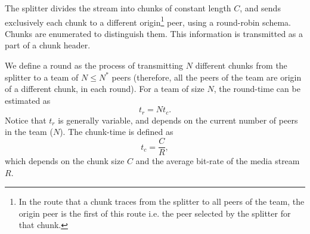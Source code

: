 

\label{sec:feeding_the_team}

The splitter divides the stream into chunks of constant length $C$,
and sends exclusively each chunk to a different
\gls{origin}\footnote{In the route that a chunk traces from the
  splitter to all peers of the team, the origin peer is the first of
  this route i.e. the peer selected by the splitter for that chunk.}
peer, using a round-robin schema. Chunks are enumerated to distinguish
them. This information is transmitted as a part of a chunk header.

\begin{comment}
More details about the implementation
are available in Fig.~\ref{fig:chunk_generation}.


\begin{figure*}
  \fig{500}{5cm}{DBS_splitter_feed} \caption{Chunk
    generation at the splitter and their transmission to the
    team.\label{fig:chunk_generation}}
\end{figure*}
\end{comment}

We define a \gls{round} as the process of transmitting $N$ different
chunks from the splitter to a team of $N\leq N^*$ peers (therefore,
all the peers of the team are origin of a different chunk, in each
round). For a team of size $N$, the \gls{round-time} can be estimated
as
\begin{equation}
  t_r=Nt_c.
\end{equation}
Notice that $t_r$ is generally variable, and depends on
the current number of peers in the team ($N$). The
\gls{chunk-time} is defined as 
\begin{equation}
  \label{eq:chunk_time}
  t_c=\frac{C}{R},
\end{equation}
which depends on the chunk size $C$ and the average bit-rate of the
media stream $R$.

\begin{comment}
(in a team) as the time necessary to send two consecutive chunks from
  the splitter (of such team) to the same peer, using the
  round-robing. This time is variable and depends on $|T|$, $C$, and
  the average bit-rate of the media, $A$.
\end{comment}

